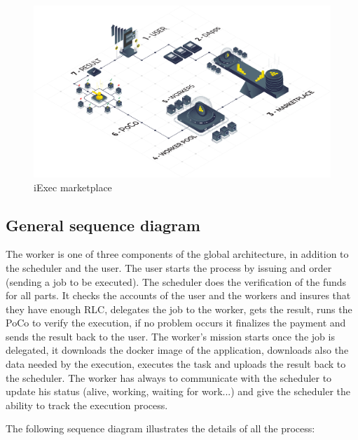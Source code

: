         \begin{figure}[!h]
            \includegraphics[width=\columnwidth]{4-Requirements/figs/iexec-marketplace.png}
            \caption{iExec marketplace}
        \end{figure}

    \subsection{General sequence diagram}
        The worker is one of three components of the global architecture, in addition to the scheduler and the user.
        The user starts the process by issuing and order (sending a job to be executed). The scheduler does the verification
        of the funds for all parts. It checks the accounts of the user and the workers and insures that they have enough RLC,
        delegates the job to the worker, gets the result, runs the PoCo to verify the execution, if no problem occurs it
        finalizes the payment and sends the result back to the user. The worker's mission starts once the job is delegated,
        it downloads the docker image of the application, downloads also the data needed by the execution, executes the task
        and uploads the result back to the scheduler. The worker has always to communicate with the scheduler to update his
        status (alive, working, waiting for work...) and give the scheduler the ability to track the execution
        process.\newline \newline

        The following sequence diagram illustrates the details of all the process:
        
        \clearpage

